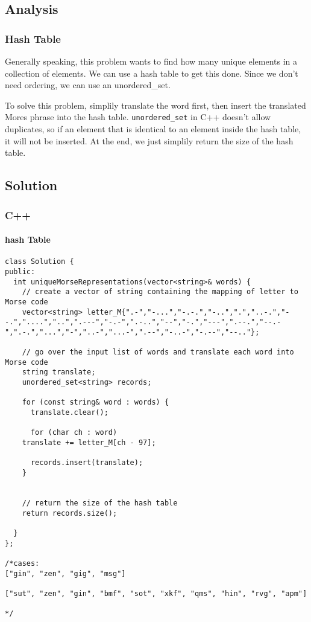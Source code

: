 \documentclass[12pt]{article}
\begin{document}
\subsection{Analysis}
\label{sec:org1db74f6}
\subsubsection{Hash Table}
\label{sec:org13b87de}
Generally speaking, this problem wants to find how many unique elements in a collection of elements. We can use a hash table to get this done. Since we don't need ordering, we can use an unordered\_set.

To solve this problem, simplily translate the word first, then insert the translated Mores phrase into the hash table. \texttt{unordered\_set} in C++ doesn't allow duplicates, so if an element that is identical to an element inside the hash table, it will not be inserted. At the end, we just simplily return the size of the hash table.
\subsection{Solution}
\label{sec:org7bd9d83}
\subsubsection{C++}
\label{sec:orgf70c22d}
\paragraph{hash Table}
\label{sec:org1d1c085}
\begin{verbatim}
class Solution {
public:
  int uniqueMorseRepresentations(vector<string>& words) {
    // create a vector of string containing the mapping of letter to Morse code 
    vector<string> letter_M{".-","-...","-.-.","-..",".","..-.","--.","....","..",".---","-.-",".-..","--","-.","---",".--.","--.-",".-.","...","-","..-","...-",".--","-..-","-.--","--.."};

    // go over the input list of words and translate each word into Morse code
    string translate;
    unordered_set<string> records;

    for (const string& word : words) {
      translate.clear();

      for (char ch : word)
	translate += letter_M[ch - 97];

      records.insert(translate);
    }


    // return the size of the hash table 
    return records.size();

  }
};

/*cases: 
["gin", "zen", "gig", "msg"]

["sut", "zen", "gin", "bmf", "sot", "xkf", "qms", "hin", "rvg", "apm"]

*/
\end{verbatim}
\end{document}
